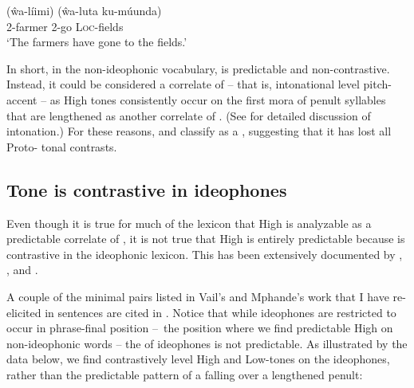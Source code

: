 \documentclass[output=paper
,newtxmath
,modfonts
,nonflat]{langsci/langscibook}
\begin{document}
\ex\label{ex:downing:4e} \gll (\^wa-líimi) (\^wa-luta ku-múunda)\\
2-farmer 2-go \textsc{Loc}{}-fields\\
\glt ‘The farmers have gone to the fields.’\\
\z
\z

In short, in the non-ideophonic vocabulary,  is predictable and non-contrastive. Instead, it could be considered a correlate of  – that is, intonational level pitch-accent – as High tones consistently occur on the first mora of penult syllables that are lengthened as another correlate of . (See \citealt{Downing2017} for detailed discussion of  intonation.) For these reasons, \citet{Kisseberth&Odden2003} and \citet{Vail1972} classify  as a , suggesting that it has lost all Proto- tonal contrasts.

\subsection{Tone is contrastive in ideophones}\label{sec:downing:2.3}

Even though it is true for much of the  lexicon that High  is analyzable as a predictable correlate of , it is not true that High  is entirely predictable because  is contrastive in the ideophonic lexicon. This has been extensively documented by \citet{Mphande1989}, \citet{Mphande1995}, and \citet{Vail1972}.

A couple of the minimal pairs listed in Vail’s and Mphande’s work that I have re-elicited in sentences are cited in . Notice that while ideophones are restricted to occur in phrase-final position –~the position where we find predictable High  on non-ideophonic words – the  of ideophones is not predictable. As illustrated by the data below, we find contrastively level High and Low-tones on the ideophones, rather than the predictable pattern of a falling  over a lengthened penult:

\begin{comment} 
\ea%
    \label{bkm:Ref99427795}
    \langinfo{lg}{fam}{src}\\
    \gll \\  
        \\
    \glt
    \z
\end{comment}
\end{document}
